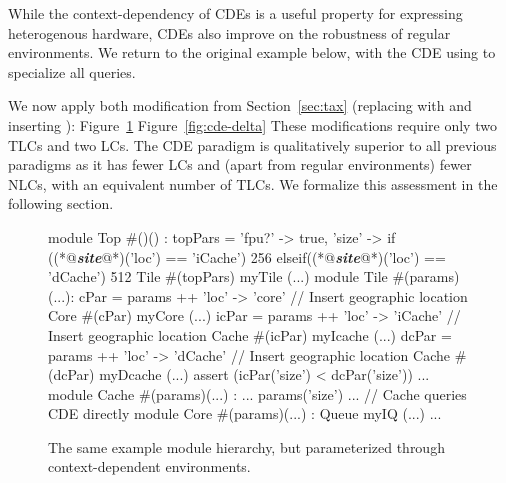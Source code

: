 While the context-dependency of CDEs is a useful property for expressing heterogenous hardware, CDEs also improve on the robustness of regular environments. We return to the original example below, with the CDE  using  to specialize all  queries.

We now apply both modification from Section~\ref{sec:tax} (replacing  with  and inserting ):
Figure~\ref{fig:cde}
Figure~\ref{fig:cde-delta}
These modifications require only two TLCs and two LCs. The CDE paradigm is qualitatively superior to all previous paradigms as it has fewer LCs and (apart from regular environments) fewer NLCs, with an equivalent number of TLCs. We formalize this assessment in the following section.

\begin{figure}
\centering
\begin{phdl}
module Top #()() :
  topPars = {'fpu?' -> true,
             'size' -> if    ((*@\textcolor[rgb]{1,0.5,0}{\textbf{\textit{site}}}@*)('loc') == 'iCache') 256 
                       elseif((*@\textcolor[rgb]{1,0.5,0}{\textbf{\textit{site}}}@*)('loc') == 'dCache') 512}
  Tile #(topPars) myTile (...)
module Tile #(params)(...):
  cPar  = params ++ {'loc' -> 'core'}   // Insert geographic location
  Core #(cPar) myCore (...)
  icPar = params ++ {'loc' -> 'iCache'} // Insert geographic location
  Cache #(icPar) myIcache (...)
  dcPar = params ++ {'loc' -> 'dCache'} // Insert geographic location
  Cache #(dcPar) myDcache (...)
  assert (icPar('size') < dcPar('size')) ...
module Cache #(params)(...) : 
   ... params('size') ...               // Cache queries CDE directly
module Core  #(params)(...) :
  Queue myIQ (...) ...
\end{phdl} 
\caption{The same example module hierarchy, but parameterized through context-dependent environments.}
\label{fig:cde}
\end{figure}

